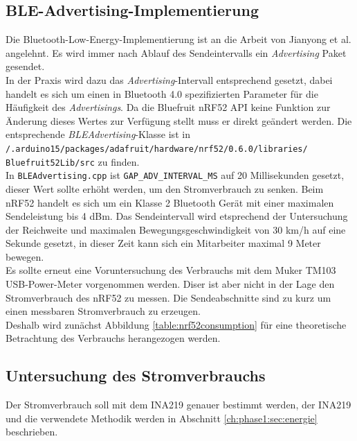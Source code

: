 \subsection{BLE-Advertising-Implementierung}
\label{ch:phase3:sec:advertising}
Die Bluetooth-Low-Energy-Implementierung ist an die Arbeit von Jianyong et al. angelehnt.
Es wird immer nach Ablauf des Sendeintervalls ein \emph{Advertising} Paket gesendet.\\
In der Praxis wird dazu das \emph{Advertising}-Intervall entsprechend gesetzt, dabei handelt es sich um einen in Bluetooth 4.0 spezifizierten Parameter für die Häufigkeit des \emph{Advertisings}.
Da die Bluefruit nRF52 API keine Funktion zur Änderung dieses Wertes zur Verfügung stellt muss er direkt geändert werden.
Die entsprechende \emph{BLEAdvertising}-Klasse ist in \\\texttt{/.arduino15/packages/adafruit/hardware/nrf52/0.6.0/libraries/}\\\texttt{Bluefruit52Lib/src} zu finden. \\
In \texttt{BLEAdvertising.cpp} ist \texttt{GAP\_ADV\_INTERVAL\_MS} auf 20 Millisekunden gesetzt, dieser Wert sollte erhöht werden, um den Stromverbrauch zu senken.
Beim nRF52 handelt es sich um ein Klasse 2 Bluetooth Gerät mit einer maximalen Sendeleistung bis 4 dBm.
Das Sendeintervall wird etsprechend der Untersuchung der Reichweite und maximalen Bewegungsgeschwindigkeit von 30 km/h auf eine Sekunde gesetzt, in dieser Zeit kann sich ein Mitarbeiter maximal 9 Meter bewegen.\\
Es sollte erneut eine Voruntersuchung des Verbrauchs mit dem Muker TM103 USB-Power-Meter vorgenommen werden.
Diser ist aber nicht in der Lage den Stromverbrauch des nRF52 zu messen.
Die Sendeabschnitte sind zu kurz um einen messbaren Stromverbrauch zu erzeugen.\\
Deshalb wird zunächst Abbildung \ref{table:nrf52consumption} für eine theoretische Betrachtung des Verbrauchs herangezogen werden. 




\subsection{Untersuchung des Stromverbrauchs}
Der Stromverbrauch soll mit dem INA219 genauer bestimmt werden, der INA219 und die verwendete Methodik werden in Abschnitt \ref{ch:phase1:sec:energie} beschrieben.

